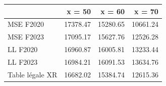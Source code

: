 \begin{tabular}{lrrr}
\toprule
 & x = 50 & x = 60 & x = 70 \\
\midrule
MSE F2020 & 17378.47 & 15280.65 & 10661.24 \\
MSE F2023 & 17095.17 & 15627.76 & 12526.28 \\
LL F2020 & 16960.87 & 16005.81 & 13233.44 \\
LL F2023 & 16984.21 & 16091.53 & 13634.76 \\
Table légale XR & 16682.02 & 15384.74 & 12615.36 \\
\bottomrule
\end{tabular}
